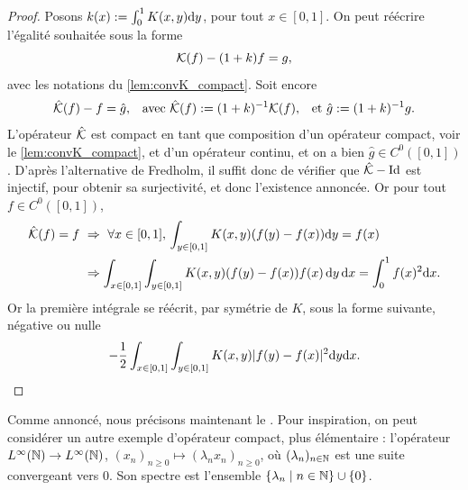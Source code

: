 \begin{proof}
	Posons $k(x) := \int_0^1 K(x,y) \mathrm{d} y$, pour tout $x\in [0,1]$.
	On peut réécrire l'égalité souhaitée sous la forme 
	\begin{equation*}
		\mathcal{K}(f) - (1+k) f = g,
	\end{equation*}
	avec les notations du \cref{lem:convK_compact}. Soit encore 
	\begin{align*}
		\hat {\mathcal{K}}(f) - f &= \hat g, &
		\text{avec } \hat {\mathcal{K}}(f) &:= (1+k)^{-1}\mathcal{K}(f), &
		\text{et } \hat g := (1+k)^{-1} g.
	\end{align*}
	L'opérateur $\hat {\mathcal{K}}$ est compact en tant que composition d'un opérateur compact, voir le \cref{lem:convK_compact}, et d'un opérateur continu, et on a bien $\hat g \in C^0([0,1])$.
	D'après l'alternative de Fredholm, il suffit donc de vérifier que $\hat {\mathcal{K}} - \operatorname{Id}$ est injectif, pour obtenir sa surjectivité, et donc l'existence annoncée. Or pour tout $f \in C^0([0,1])$,
	\begin{align*}
		\hat \cK(f) = f \ 
		& \Rightarrow \ \forall x\in [0,1],\, \int_{y \in [0,1]} K(x,y) (f(y)-f(x)) \diff y = f(x)\\
		& \Rightarrow \int_{x\in [0,1]} \int_{y\in [0,1]}  K(x,y) (f(y)-f(x)) f(x) \, \diff y \, \diff x = \int_0^1 f(x)^2 \diff x.
	\end{align*}
	Or la première intégrale se réécrit, par symétrie de $K$, sous la forme suivante, négative ou nulle
	\begin{equation*}
		-\frac 1 2 \int_{x\in [0,1]} \int_{y\in [0,1]} K(x,y) |f(y)-f(x)|^2 \mathrm{d} y \mathrm{d} x.
		\qedhere
	\end{equation*}	
\end{proof}

Comme annoncé, nous précisons maintenant le . Pour inspiration, on peut  considérer un autre exemple d'opérateur compact, plus élémentaire : l'opérateur $L^\infty(\mathbb{N}) \to L^\infty(\mathbb{N})$, $(x_n)_{n \geq 0} \mapsto (\lambda_n x_n)_{n \geq 0}$, où $(\lambda_n)_{n \in \mathbb{N}}$ est une suite convergeant vers $0$. Son spectre est l'ensemble $\{\lambda_n \mid n \in \mathbb{N}\} \cup \{0\}$. 



